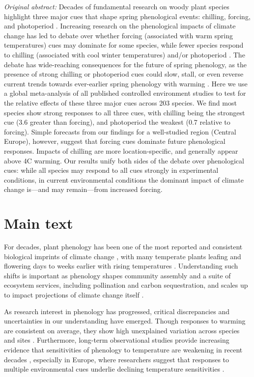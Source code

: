 \documentclass{article}
\begin{document}
\emph{Original abstract:} Decades of fundamental research on woody plant species highlight three major cues that shape spring phenological events: chilling, forcing, and photoperiod \citep[e.g.,][]{Campbell:1975aa,Heide:2008aa,flynn2018}. Increasing research on the phenological impacts of climate change has led to debate over whether forcing (associated with warm spring temperatures) cues may dominate for some species, while fewer species respond to chilling (associated with cool winter temperatures) and/or photoperiod \citep{Heide:2011aa,koerner2010b,zohner2016}. The debate has wide-reaching consequences for the future of spring phenology, as the presence of strong chilling or photoperiod cues could slow, stall, or even reverse current trends towards ever-earlier spring phenology with warming \citep{fu2015,koerner2010a}. Here we use a global meta-analysis of all published controlled environment studies to test for the relative effects of these three major cues across 203 species. We find most species show strong responses to all three cues, with chilling being the strongest cue (3.6 greater than forcing), and photoperiod the weakest (0.7 relative to forcing). Simple forecasts from our findings for a well-studied region (Central Europe), however, suggest that forcing cues dominate future phenological responses. Impacts of chilling are more location-specific, and generally appear above 4\degree C warming. Our results unify both sides of the debate over phenological cues: while all species may respond to all cues strongly in experimental conditions, in current environmental conditions the dominant impact of climate change is---and may remain---from increased forcing. 

\section* {Main text}

\par For decades, plant phenology has been one of the most reported and consistent biological imprints of climate change \citep{IPCC:2014sm}, with many temperate plants leafing and flowering days to weeks earlier with rising temperatures \citep{millerrushing2008,menzel2006}. Understanding such shifts is important as phenology shapes community assembly and a suite of ecosystem services, including pollination and carbon sequestration, and scales up to impact projections of climate change itself \citep{Cleland:2007or}.
\par As research interest in phenology has progressed, critical discrepancies and uncertainties in our understanding have emerged. Though responses to warming are consistent on average, they show high unexplained variation across species and sites \citep{Wolkovich:2012n}. Furthermore, long-term observational studies provide increasing evidence that sensitivities of phenology to temperature are weakening in recent decades \citep{Rutishauser:2008,yu2010}, especially in Europe, where researchers suggest that responses to multiple environmental cues underlie declining temperature sensitivities \citep{fu2015}.
\end{document}

